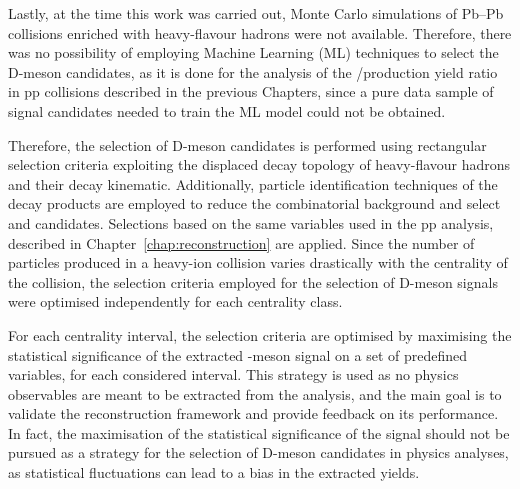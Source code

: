 Lastly, at the time this work was carried out, Monte Carlo simulations of Pb--Pb collisions enriched with heavy-flavour hadrons were not available. Therefore, there was no possibility of employing Machine Learning (ML) techniques to select the D-meson candidates, as it is done for the analysis of the \ds/\dpl production yield ratio in pp collisions described in the previous Chapters, since a pure data sample of signal candidates needed to train the ML model could not be obtained. 

Therefore, the selection of D-meson candidates is performed using rectangular selection criteria exploiting the displaced decay topology of heavy-flavour hadrons and their decay kinematic. Additionally, particle identification techniques of the decay products are employed to reduce the combinatorial background and select \ds and \dpl candidates. Selections based on the same variables used in the pp analysis, described in Chapter~\ref{chap:reconstruction} are applied. Since the number of particles produced in a heavy-ion collision varies drastically with the centrality of the collision, the selection criteria employed for the selection of D-meson signals were optimised independently for each centrality class.

For each centrality interval, the selection criteria are optimised by maximising the statistical significance of the extracted \ds-meson signal on a set of predefined variables, for each considered \pt interval. This strategy is used as no physics observables are meant to be extracted from the analysis, and the main goal is to validate the reconstruction framework and provide feedback on its performance. In fact, the maximisation of the statistical significance of the signal should not be pursued as a strategy for the selection of D-meson candidates in physics analyses, as statistical fluctuations can lead to a bias in the extracted yields. 
 
